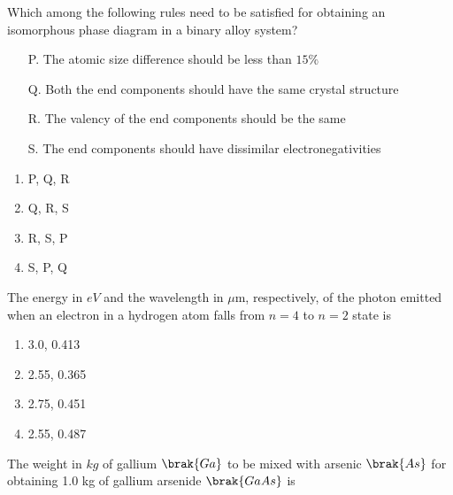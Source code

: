     \item Which among the following rules need to be satisfied for obtaining an isomorphous phase diagram
        in a binary alloy system? 
        \begin{enumerate}
            \item[P.] The atomic size difference should be less than $15\%$ 
            \item[Q.] Both the end components should have the same crystal structure
            \item[R.] The valency of the end components should be the same
            \item[S.] The end components should have dissimilar electronegativities
        \end{enumerate}
        \hfill{}
        \begin{multicols}{4}
            \begin{enumerate}
                \item  P, Q, R \columnbreak
                \item  Q, R, S \columnbreak
                \item  R, S, P  \columnbreak
                \item  S, P, Q
            \end{enumerate}
        \end{multicols}


    \item The energy in $eV$ and the wavelength in $\mu$m, respectively, of the photon emitted when an electron
        in a hydrogen atom falls from $n = 4$ to $n = 2$ state is
        \hfill{}
        \begin{multicols}{4}
            \begin{enumerate}
                \item  3.0, 0.413 \columnbreak
                \item  2.55, 0.365 \columnbreak
                \item  2.75, 0.451  \columnbreak
                \item  2.55, 0.487
            \end{enumerate}
        \end{multicols}

    \item  The weight in $kg$ of gallium $\brak{Ga}$ to be mixed with arsenic $\brak{As}$ for obtaining 1.0 kg of gallium
        arsenide $\brak{GaAs}$ is
        \hfill{}

